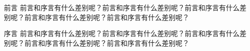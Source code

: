 \begin{preamble}{前言}
    前言和序言有什么差别呢？前言和序言有什么差别呢？前言和序言有什么差别呢？前言和序言有什么差别呢？前言和序言有什么差别呢？
\end{preamble}
\begin{preamble}{序言}
    前言和序言有什么差别呢？前言和序言有什么差别呢？前言和序言有什么差别呢？前言和序言有什么差别呢？前言和序言有什么差别呢？
\end{preamble}
